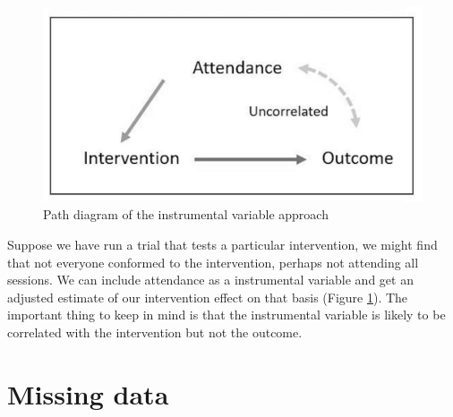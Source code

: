 \documentclass{krantz}
\begin{document}
\begin{figure}
\includegraphics[width=0.6\linewidth]{images_bw/IV1} \caption{Path diagram of the instrumental variable approach}\label{fig:IVfig}
\end{figure}

Suppose we have run a trial that tests a particular intervention, we might find that not everyone conformed to the intervention, perhaps not attending all sessions. We can include attendance as a instrumental variable and get an adjusted estimate of our intervention effect on that basis (Figure \ref{fig:IVfig}). The important thing to keep in mind is that the instrumental variable is likely to be correlated with the intervention but not the outcome.

\hypertarget{missing-data}{%
\section{Missing data}\label{missing-data}}
\end{document}
